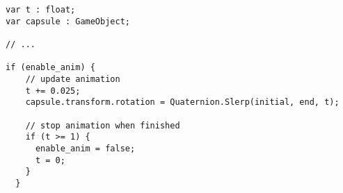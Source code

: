 \begin{verbatim}
var t : float;
var capsule : GameObject;

// ...

if (enable_anim) {
    // update animation
    t += 0.025;
    capsule.transform.rotation = Quaternion.Slerp(initial, end, t);

    // stop animation when finished
    if (t >= 1) {
      enable_anim = false;
      t = 0;
    }
  }
\end{verbatim}